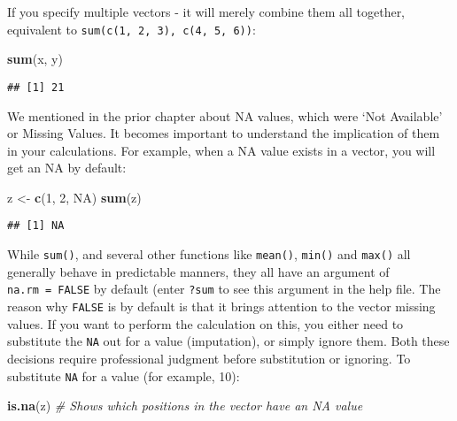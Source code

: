 \documentclass[
]{book}
\newenvironment{Shaded}{\begin{snugshade}}{\end{snugshade}}
\newcommand{\CommentTok}[1]{\textcolor[rgb]{0.56,0.35,0.01}{\textit{#1}}}
\newcommand{\DecValTok}[1]{\textcolor[rgb]{0.00,0.00,0.81}{#1}}
\newcommand{\KeywordTok}[1]{\textcolor[rgb]{0.13,0.29,0.53}{\textbf{#1}}}
\newcommand{\NormalTok}[1]{#1}
\newcommand{\OtherTok}[1]{\textcolor[rgb]{0.56,0.35,0.01}{#1}}
\newcommand{\StringTok}[1]{\textcolor[rgb]{0.31,0.60,0.02}{#1}}
\begin{document}
If you specify multiple vectors - it will merely combine them all together, equivalent to \texttt{sum(c(1,\ 2,\ 3),\ c(4,\ 5,\ 6))}:

\begin{Shaded}
\begin{Highlighting}[]
\KeywordTok{sum}\NormalTok{(x, y)}
\end{Highlighting}
\end{Shaded}

\begin{verbatim}
## [1] 21
\end{verbatim}

We mentioned in the prior chapter about NA values, which were `Not Available' or Missing Values. It becomes important to understand the implication of them in your calculations. For example, when a NA value exists in a vector, you will get an NA by default:

\begin{Shaded}
\begin{Highlighting}[]
\NormalTok{z <-}\StringTok{ }\KeywordTok{c}\NormalTok{(}\DecValTok{1}\NormalTok{, }\DecValTok{2}\NormalTok{, }\OtherTok{NA}\NormalTok{)}
\KeywordTok{sum}\NormalTok{(z)}
\end{Highlighting}
\end{Shaded}

\begin{verbatim}
## [1] NA
\end{verbatim}

While \texttt{sum()}, and several other functions like \texttt{mean()}, \texttt{min()} and \texttt{max()} all generally behave in predictable manners, they all have an argument of \texttt{na.rm\ =\ FALSE} by default (enter \texttt{?sum} to see this argument in the help file. The reason why \texttt{FALSE} is by default is that it brings attention to the vector missing values. If you want to perform the calculation on this, you either need to substitute the \texttt{NA} out for a value (imputation), or simply ignore them. Both these decisions require professional judgment before substitution or ignoring. To substitute \texttt{NA} for a value (for example, 10):

\begin{Shaded}
\begin{Highlighting}[]
\KeywordTok{is.na}\NormalTok{(z) }\CommentTok{# Shows which positions in the vector have an NA value}
\end{Highlighting}
\end{Shaded}
\end{document}
